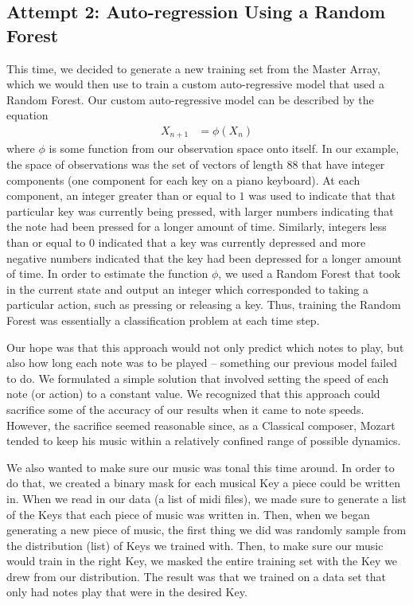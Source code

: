 \documentclass[11pt]{article}
\begin{document}
\subsection{Attempt 2: Auto-regression Using a Random Forest}
This time, we decided to generate a new training set from the Master Array, which we would then use to train a custom auto-regressive model that used a Random Forest. 
Our custom auto-regressive model can be described by the equation
\begin{align*}
    X_{n+1} &= \phi(X_n)
\end{align*}
where $\phi$ is some function from our observation space onto itself. In our example, the space of observations was the set of vectors of length $88$ that have integer components (one component for each key on a piano keyboard). At each component, an integer greater than or equal to $1$ was used to indicate that that particular key was currently being pressed, with larger numbers indicating that the note had been pressed for a longer amount of time. Similarly, integers less than or equal to $0$ indicated that a key was currently depressed and more negative numbers indicated that the key had been depressed for a longer amount of time.
In order to estimate the function $\phi$, we used a Random Forest that took in the current state and output an integer which corresponded to taking a particular action, such as pressing or releasing a key. Thus, training the Random Forest was essentially a classification problem at each time step.

Our hope was that this approach would not only predict which notes to play, but also how long each note was to be played -- something our previous model failed to do. We formulated a simple solution that involved setting the speed of each 
note (or action) to a constant value. We recognized that this approach could sacrifice some of the accuracy of our results when it came to note speeds. However, the sacrifice seemed reasonable since, as a Classical 
composer, Mozart tended to keep his music within a relatively confined range
of possible dynamics.

We also wanted to make sure our music was tonal this time around. In order
to do that, we created a binary mask for each musical Key a piece could be
written in. When we read in our data (a list of midi files), we made sure to
generate a list of the Keys that each piece of music was written in. Then, when we began generating a new piece of music, the first thing we did was randomly sample from the distribution (list) of Keys we trained with. Then, to make sure our music 
would train in the right Key, we masked the entire training set with the Key 
we drew from our distribution. The result was that we trained on a data set
that only had notes play that were in the desired Key.
\end{document}
